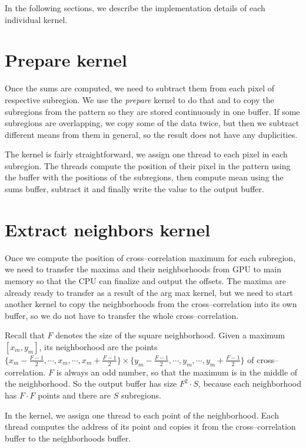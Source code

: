 In the following sections, we describe the implementation details of each individual kernel.


\section{Prepare kernel}
Once the sums are computed, we need to subtract them from each pixel of respective subregion. We use the \emph{prepare} kernel to do that and to copy the subregions from the pattern so they are stored continuously in one buffer. If some subregions are overlapping, we copy some of the data twice, but then we subtract different means from them in general, so the result does not have any duplicities.

The kernel is fairly straightforward, we assign one thread to each pixel in each subregion. The threads compute the position of their pixel in the pattern using the buffer with the positions of the subregions, then compute mean using the sums buffer, subtract it and finally write the value to the output buffer.




\section{Extract neighbors kernel}

Once we compute the position of cross--correlation maximum for each subregion, we need to transfer the maxima and their neighborhoods from GPU to main memory so that the CPU can finalize and output the offsets. The maxima are already ready to transfer as a result of the arg max kernel, but we need to start another kernel to copy the neighborhoods from the cross--correlation into its own buffer, so we do not have to transfer the whole cross--correlation.

Recall that $F$ denotes the size of the square neighborhood. Given a maximum $[x_m, y_m]$, its neighborhood are the points $\{x_m - \frac{F-1}{2}, \cdots, x_m, \cdots, x_m + \frac{F-1}{2}\} \times \{y_m - \frac{F-1}{2}, \cdots, y_m, \cdots, y_m + \frac{F-1}{2}\}$ of cross--correlation. $F$ is always an odd number, so that the maximum is in the middle of the neighborhood. So the output buffer has size $F^2 \cdot S$, because each neighborhood has $F \cdot F$ points and there are $S$ subregions.

In the kernel, we assign one thread to each point of the neighborhood. Each thread computes the address of its point and copies it from the cross--correlation buffer to the neighborhoods buffer.

